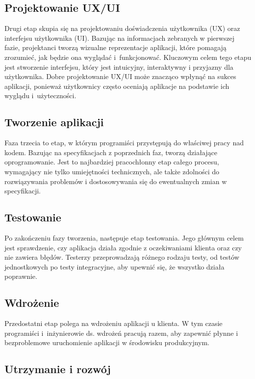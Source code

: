 \subsection{Projektowanie UX/UI}

Drugi etap skupia się na projektowaniu doświadczenia użytkownika (UX) oraz interfejsu użytkownika (UI). Bazując na informacjach zebranych w pierwszej fazie, projektanci tworzą wizualne reprezentacje aplikacji, które pomagają zrozumieć, jak będzie ona wyglądać i~funkcjonować. Kluczowym celem tego etapu jest stworzenie interfejsu, który jest intuicyjny, interaktywny i przyjazny dla użytkownika. Dobre projektowanie UX/UI może znacząco wpłynąć na sukces aplikacji, ponieważ użytkownicy często oceniają aplikacje na podstawie ich wyglądu i~użyteczności.

\subsection{Tworzenie aplikacji}

Faza trzecia to etap, w którym programiści przystępują do właściwej pracy nad kodem. Bazując na specyfikacjach z poprzednich faz, tworzą działające oprogramowanie. Jest to najbardziej pracochłonny etap całego procesu, wymagający nie tylko umiejętności technicznych, ale także zdolności do rozwiązywania problemów i dostosowywania się do ewentualnych zmian w specyfikacji.

\subsection{Testowanie}

Po zakończeniu fazy tworzenia, następuje etap testowania. Jego głównym celem jest sprawdzenie, czy aplikacja działa zgodnie z oczekiwaniami klienta oraz czy nie zawiera błędów. Testerzy przeprowadzają różnego rodzaju testy, od testów jednostkowych po testy integracyjne, aby upewnić się, że wszystko działa poprawnie.

\subsection{Wdrożenie}

Przedostatni etap polega na wdrożeniu aplikacji u klienta. W tym czasie programiści i~inżynierowie ds. wdrożeń pracują razem, aby zapewnić płynne i bezproblemowe uruchomienie aplikacji w środowisku produkcyjnym.

\subsection{Utrzymanie i rozwój}

